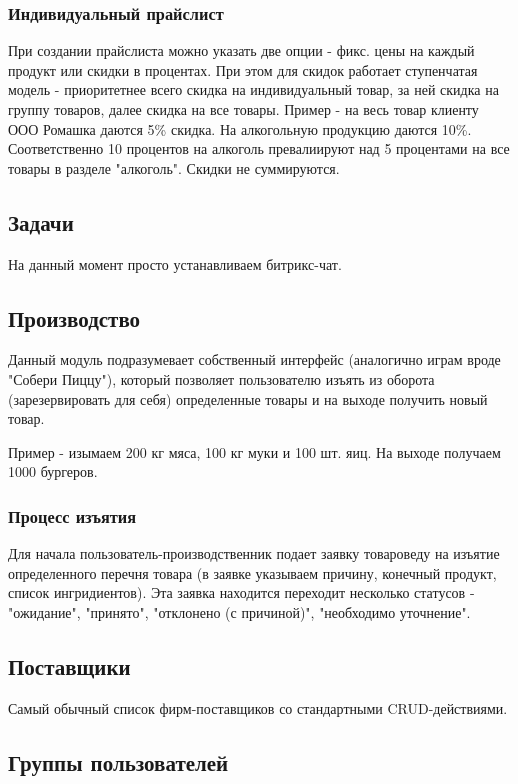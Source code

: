 \documentclass[DIV=calc, paper=a4, fontsize=11pt]{scrartcl} %
\begin{document}
\subsubsection{Индивидуальный прайслист}
При создании прайслиста можно указать две опции - фикс. цены на каждый продукт или скидки в процентах. При этом для скидок работает ступенчатая модель - приоритетнее всего скидка на индивидуальный товар, за ней скидка на группу товаров, далее скидка на все товары.
Пример - на весь товар клиенту ООО Ромашка даются 5\% скидка. На алкогольную продукцию даются 10\%. Соответственно 10 процентов на алкоголь превалиируют над 5 процентами на все товары в разделе "алкоголь". Скидки не суммируются.

\subsection{Задачи}

На данный момент просто устанавливаем битрикс-чат.

\subsection{Производство}

Данный модуль подразумевает собственный интерфейс (аналогично играм вроде "Собери Пиццу"), который позволяет пользователю изъять из оборота (зарезервировать для себя) определенные товары и на выходе получить новый товар.

Пример - изымаем 200 кг мяса, 100 кг муки и 100 шт. яиц. На выходе получаем 1000 бургеров. 

\subsubsection{Процесс изъятия}

Для начала пользователь-производственник подает заявку товароведу на изъятие определенного перечня товара (в заявке указываем причину, конечный продукт, список ингридиентов). Эта заявка находится переходит несколько статусов - "ожидание", "принято", "отклонено (с причиной)", "необходимо уточнение".

\subsection{Поставщики}

Самый обычный список фирм-поставщиков со стандартными CRUD-действиями.

\subsection{Группы пользователей}
\end{document}
